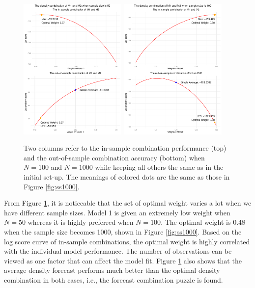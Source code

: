 \documentclass{monashthesis}
\begin{document}
\begin{figure}
\includegraphics[width=0.47\textwidth]{figures/ss_50.pdf}
\hspace{\fill}
\includegraphics[width=0.47\textwidth]{figures/ss_100.pdf}
\caption{Two columns refer to the in-sample combination performance (top) and the out-of-sample combination accuracy (bottom) when $N=100$ and $N=1000$ while keeping all others the same as in the initial set-up. The meanings of colored dots are the same as those in Figure \ref{fig:ss1000}.}
\label{fig:samplesize}
\end{figure}

From Figure \ref{fig:samplesize}, it is noticeable that the set of optimal weight varies a lot when we have different sample sizes. Model 1 is given an extremely low weight when \(N=50\) whereas it is highly preferred when \(N=100\). The optimal weight is 0.48 when the sample size becomes 1000, shown in Figure \ref{fig:ss1000}. Based on the log score curve of in-sample combinations, the optimal weight is highly correlated with the individual model performance. The number of observations can be viewed as one factor that can affect the model fit. Figure \ref{fig:samplesize} also shows that the average density forecast performs much better than the optimal density combination in both cases, i.e., the forecast combination puzzle is found.
\end{document}
